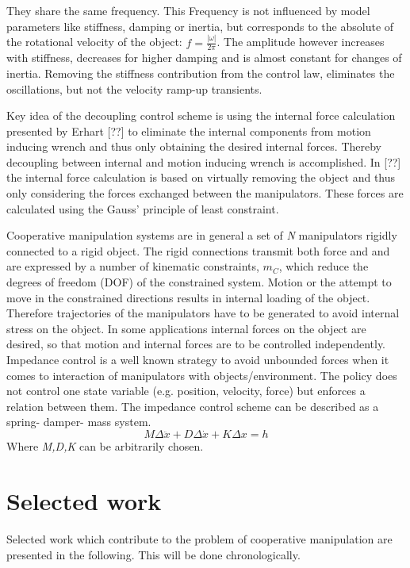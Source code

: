 \documentclass[conference]{IEEEtran}
\begin{document}
They share the same frequency. This Frequency is not influenced by model parameters like stiffness, damping or inertia, but corresponds to the absolute of the rotational velocity of the object: $ f = \frac{\vert\omega\vert}{2\pi} $. The amplitude however increases with stiffness, decreases for higher damping and is almost constant for changes of inertia. Removing the stiffness contribution from the control law, eliminates the oscillations, but not the velocity ramp-up transients.  




Key idea of the decoupling control scheme is using the internal force calculation presented by Erhart [??] to eliminate the internal components from motion inducing wrench and thus only obtaining the desired internal forces. Thereby decoupling between internal and motion inducing wrench is accomplished. In [??] the internal force calculation is based on virtually removing the object and thus only considering the forces exchanged between the manipulators. These forces are calculated using the Gauss' principle of least constraint. 

Cooperative manipulation systems are in general a set of \textit{N} manipulators rigidly connected to a rigid object. The rigid connections transmit both force and and are expressed by a number of kinematic constraints, \textit{$ m_{C} $}, which reduce the degrees of freedom (DOF) of the constrained system. Motion or the attempt to move in the constrained directions results in internal loading of the object. Therefore trajectories of the manipulators have to be generated to avoid internal stress on the object. In some applications internal forces on the object are desired, so that motion and internal forces are to be controlled independently.
Impedance control is a well known strategy to avoid unbounded forces when it comes to interaction of manipulators with objects/environment. The policy does not control one state variable (e.g. position, velocity, force) but enforces a relation between them. The impedance control scheme can be described as a spring- damper- mass system.
\begin{equation}
M\Delta\ddot{x} + D\Delta\dot{x} + K\Delta x = h
\end{equation}
Where \textit{M,D,K} can be arbitrarily chosen.


\section{Selected work}
Selected work which contribute to the problem of cooperative manipulation are presented in the following. This will be done chronologically.
\end{document}
